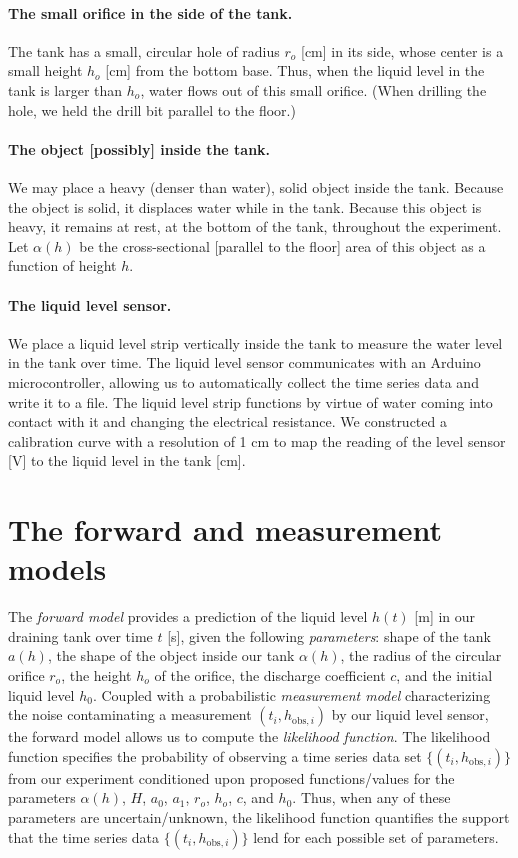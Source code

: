 \documentclass[openacc]{rsproca_new}%
\begin{document}
\paragraph{The small orifice in the side of the tank.} The tank has a small, circular hole of radius $r_o$ [cm] in its side, whose center is a small height $h_o$ [cm] from the bottom base.
Thus, when the liquid level in the tank is larger than $h_o$, water flows out of this small orifice.
(When drilling the hole, we held the drill bit parallel to the floor.) 

\paragraph{The object [possibly] inside the tank.} We may place a heavy (denser than water), solid object inside the tank. Because the object is solid, it displaces water while in the tank. Because this object is heavy, it remains at rest, at the bottom of the tank, throughout the experiment. Let $\alpha(h)$ be the cross-sectional [parallel to the floor] area of this object as a function of height $h$.

\paragraph{The liquid level sensor.} We place a liquid level strip vertically inside the tank to measure the water level in the tank over time. The liquid level sensor communicates with an Arduino microcontroller, allowing us to automatically collect the time series data and write it to a file. The liquid level strip functions by virtue of water coming into contact with it and changing the electrical resistance. 
We constructed a calibration curve with a resolution of 1 cm to map the reading of the level sensor [V] to the liquid level in the tank [cm]. 

\section{The forward and measurement models}
The \emph{forward model} provides a prediction of the liquid level $h(t)$ [m] in our draining tank over time $t$ [s], given the following \emph{parameters}: shape of the tank $a(h)$, the shape of the object inside our tank $\alpha(h)$, the radius of the circular orifice $r_o$, the height $h_o$ of the orifice, the discharge coefficient $c$, and the initial liquid level $h_0$. 
Coupled with a probabilistic \emph{measurement model} characterizing the noise contaminating a measurement $(t_i, h_{\text{obs}, i})$ by our liquid level sensor, the forward model allows us to compute the \emph{likelihood function}. The likelihood function specifies the probability of observing a time series data set $\{(t_i, h_{\text{obs}, i})\}$ from our experiment conditioned upon proposed functions/values for the parameters $\alpha(h)$, $H$, $a_0$, $a_1$, $r_o$, $h_o$, $c$, and $h_0$. Thus, when any of these parameters are uncertain/unknown, the likelihood function quantifies the support that the time series data $\{(t_i, h_{\text{obs}, i})\}$ lend for each possible set of parameters.
\end{document}
